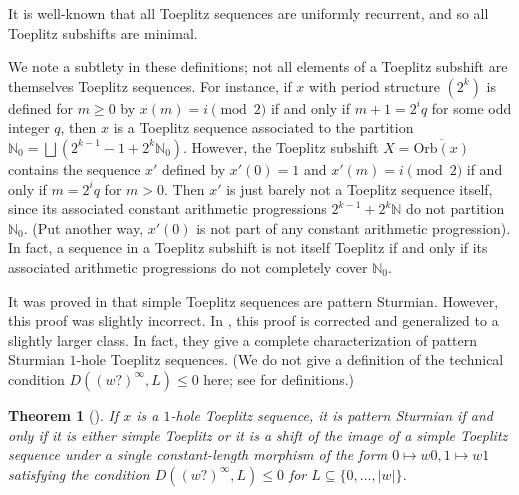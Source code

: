 \documentclass[11pt,reqno]{amsart}
\newtheorem{theorem}{Theorem}[section]
\theoremstyle{definition}
\theoremstyle{plain}
\newcommand{\OO}{\mathrm{Orb}}
\newcommand{\N}{\mathbb{N}}
\newcommand{\AuthornoteA}[2]{{\sf\small\color{magenta}{[#1: #2]}}}
\newcommand{\AuthornoteR}[2]{{\sf\small\color{blue}{[#1: #2]}}}
\newcommand{\AuthornoteC}[2]{{\sf\small\color{cyan}{[#1: #2]}}}
\newcommand{\Anote}{\AuthornoteA{A}}
\newcommand{\rp}{\AuthornoteR{R}}
\newcommand{\Cnote}{\AuthornoteC{C}}
\begin{document}
It is well-known that all Toeplitz sequences are uniformly recurrent, and so all Toeplitz subshifts are minimal.


We note a subtlety in these definitions; not all elements of a Toeplitz subshift are themselves Toeplitz sequences. For instance, if $x$ with period structure $(2^k)$ is defined for $m \geq 0$ by $x(m) = i \pmod 2$ if and only if $m+1 = 2^i q$ for some odd integer $q$, then $x$ is a Toeplitz sequence associated to the partition $\N_0 = \bigsqcup (2^{k-1} - 1 + 2^k \N_0)$. However, the Toeplitz subshift $X = \overline{\OO(x)}$ contains the sequence $x'$ defined by $x'(0) = 1$ and $x'(m) = i \pmod 2$ if and only if $m = 2^i q$ for $m > 0$. Then $x'$ is just barely not a Toeplitz sequence itself, since its associated constant arithmetic progressions $2^{k-1} + 2^k \N$ do not partition $\N_0$. (Put another way, $x'(0)$ is not part of any constant arithmetic progression). In fact, a sequence in a Toeplitz subshift is not itself Toeplitz if and only if its associated arithmetic progressions do not completely cover $\N_0$.


It was proved in \cite{Kamae-Zamboni-discrete} that simple Toeplitz sequences are pattern Sturmian. However, this proof was slightly incorrect. In \cite{Gjini_Kamae_Bo_Yu-Mei-toeplitz}, this proof is corrected and generalized to a slightly larger class. In fact, they give a complete characterization of pattern Sturmian $1$-hole Toeplitz sequences. (We do not give a definition of the technical condition $D((w?)^\infty, L) \leq 0$ here; see \cite[Page 1076]{Gjini_Kamae_Bo_Yu-Mei-toeplitz} for definitions.)

\begin{theorem}[{\cite[Theorem 2]{Gjini_Kamae_Bo_Yu-Mei-toeplitz}}]\label{onehole}
If $x$ is a $1$-hole Toeplitz sequence, it is pattern Sturmian if and only if it is either simple Toeplitz or it is a shift of the image of a simple Toeplitz sequence under a single constant-length morphism of the form $0 \mapsto w0, 1\mapsto w1$ satisfying the condition $D((w?)^\infty, L) \leq 0$ for $L \subseteq \{0, \ldots, |w|\}$.
\end{theorem}
\end{document}
